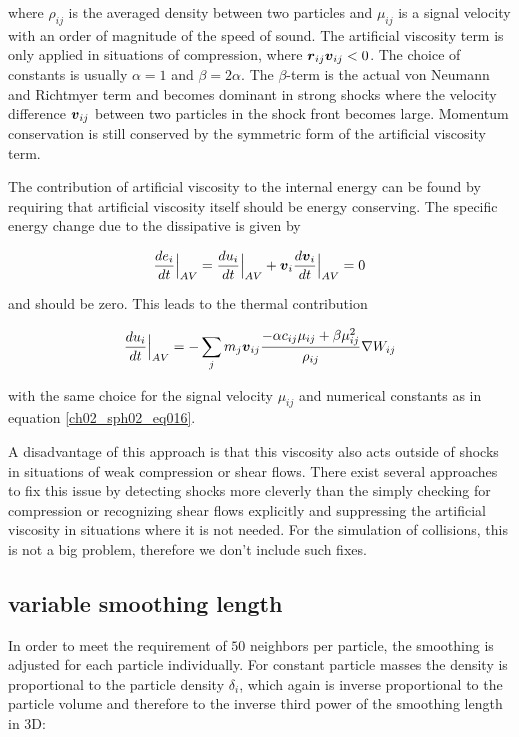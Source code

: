 where $\rho_{ij}$ is the averaged density between two particles and $\mu_{ij}$ is a signal velocity with an order of magnitude of the speed of sound. The artificial viscosity term is only applied in situations of compression, where $\boldsymbol{r}_{ij} \boldsymbol{v}_{ij} < 0$. The choice of constants is usually $\alpha = 1$ and $\beta = 2 \alpha$. The $\beta$-term is the actual von Neumann and Richtmyer term and becomes dominant in strong shocks where the velocity difference $\boldsymbol{v}_{ij}$ between two particles in the shock front becomes large. Momentum conservation is still conserved by the symmetric form of the artificial viscosity term.

The contribution of artificial viscosity to the internal energy can be found by requiring that artificial viscosity itself should be energy conserving. The specific energy change due to the dissipative is given by

\begin{equation}
\label{ch02_sph02_eq017}
\frac{de_i}{dt} \Big|_{AV}  = \frac{du_i}{dt}  \Big|_{AV} + \boldsymbol{v}_i \frac{d\boldsymbol{v}_i}{dt}  \Big|_{AV} = 0
\end{equation}

and should be zero. This leads to the thermal contribution

\begin{equation}
\label{ch02_sph02_eq018}
\frac{du_i }{dt} \Big|_{AV} = - \sum_{j} m_j \boldsymbol{v}_{ij} \frac{-\alpha c_{ij} \mu_{ij} + \beta \mu_{ij}^2}{\rho_{ij}} \nabla W_{ij}
\end{equation}

with the same choice for the signal velocity $\mu_{ij}$ and numerical constants as in equation \ref{ch02_sph02_eq016}. 

A disadvantage of this approach is that this viscosity also acts outside of shocks in situations of weak compression or shear flows. There exist several approaches to fix this issue by detecting shocks more cleverly \citep{Morris1997J.-Comput.-Phys.Morris} than the simply checking for compression or recognizing shear flows explicitly \citep{Balsara1995JCoPh.121..357B} and suppressing the artificial viscosity in situations where it is not needed. For the simulation of collisions, this is not a big problem, therefore we don't include such fixes.

\subsection{variable smoothing length}
In order to meet the requirement of $50$ neighbors per particle, the smoothing is adjusted for each particle individually. For constant particle masses the density is proportional to the particle density $\delta_i$, which again is inverse proportional to the particle volume and therefore to the inverse third power of the smoothing length in 3D:

